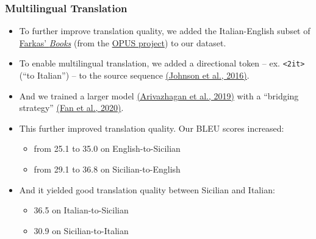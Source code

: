 \documentclass{beamer}
\begin{document}
\begin{frame}
  \frametitle{Multilingual Translation}
  \vspace{-1.0em}
  \begin{itemize}
  \item To further improve translation quality, we added the Italian-English subset of
    \href{https://farkastranslations.com/bilingual_books.php}{Farkas' \textit{Books}}
    (from the \href{http://opus.nlpl.eu/}{OPUS project}) to our dataset.
    \vspace{0.35em}
  \item To enable multilingual translation, we added a directional token -- ex. \texttt{<2it>} (``to Italian'') -- to the
    source sequence \href{https://arxiv.org/abs/1611.04558}{(Johnson et al., 2016)}.
    \vspace{0.35em}
  \item And we trained a larger model \href{https://arxiv.org/abs/1907.05019}{(Arivazhagan et al., 2019)}
    with a ``bridging strategy'' \href{https://arxiv.org/abs/2010.11125}{(Fan et al., 2020)}.
    \vspace{0.35em}
  \item This further improved translation quality. Our BLEU scores increased:
    \begin{itemize}
    \item from 25.1 to 35.0 on English-to-Sicilian %
    \item from 29.1 to 36.8 on Sicilian-to-English %
    \end{itemize}
    \vspace{0.25em}
  \item And it yielded good translation quality between Sicilian and Italian:
    \begin{itemize}
    \item 36.5 on Italian-to-Sicilian %
    \item 30.9 on Sicilian-to-Italian %
    \end{itemize}    
  \end{itemize}
\end{frame}
\end{document}
